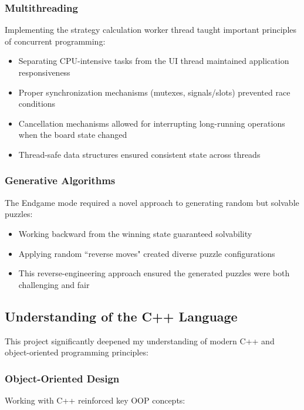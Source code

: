 \subsubsection{Multithreading}
Implementing the strategy calculation worker thread taught important principles of concurrent programming:

\begin{itemize}
    \item Separating CPU-intensive tasks from the UI thread maintained application responsiveness
    \item Proper synchronization mechanisms (mutexes, signals/slots) prevented race conditions
    \item Cancellation mechanisms allowed for interrupting long-running operations when the board state changed
    \item Thread-safe data structures ensured consistent state across threads
\end{itemize}

\subsubsection{Generative Algorithms}
The Endgame mode required a novel approach to generating random but solvable puzzles:

\begin{itemize}
    \item Working backward from the winning state guaranteed solvability
    \item Applying random ``reverse moves" created diverse puzzle configurations
    \item This reverse-engineering approach ensured the generated puzzles were both challenging and fair
\end{itemize}

\subsection{Understanding of the C++ Language}
This project significantly deepened my understanding of modern C++ and object-oriented programming principles:

\subsubsection{Object-Oriented Design}
Working with C++ reinforced key OOP concepts:

